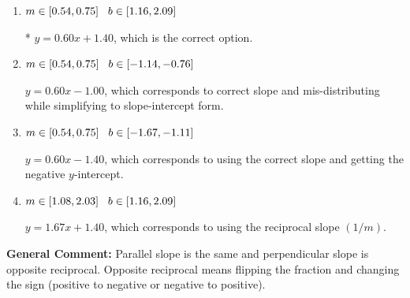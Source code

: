 \documentclass{extbook}[14pt]
\begin{document}
\begin{enumerate}
{\begin{enumerate}[label=\Alph*.]
 $y = -0.60x + 8.60$, which corresponds to using the negative slope.
\item \( m \in [0.54, 0.75] \hspace*{3mm} b \in [1.16, 2.09] \)

* $y = 0.60x + 1.40$, which is the correct option.
\item \( m \in [0.54, 0.75] \hspace*{3mm} b \in [-1.14, -0.76] \)

 $y = 0.60x - 1.00$, which corresponds to correct slope and mis-distributing while simplifying to slope-intercept form.
\item \( m \in [0.54, 0.75] \hspace*{3mm} b \in [-1.67, -1.11] \)

 $y = 0.60x - 1.40$, which corresponds to using the correct slope and getting the negative $y$-intercept.
\item \( m \in [1.08, 2.03] \hspace*{3mm} b \in [1.16, 2.09] \)

 $y = 1.67x + 1.40$, which corresponds to using the reciprocal slope $(1/m)$.
\end{enumerate}

\textbf{General Comment:} Parallel slope is the same and perpendicular slope is opposite reciprocal. Opposite reciprocal means flipping the fraction and changing the sign (positive to negative or negative to positive).
}
\end{enumerate}
\end{document}
